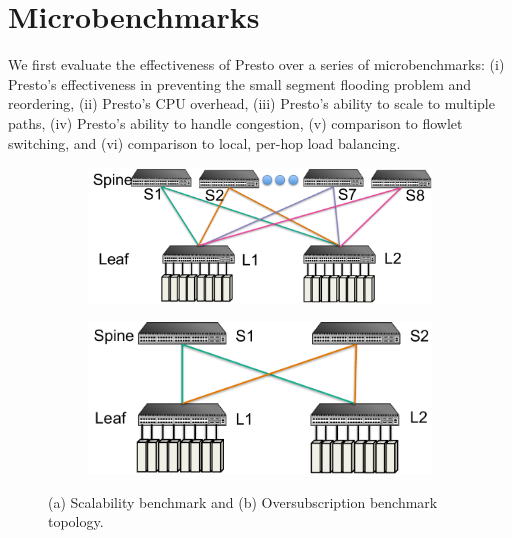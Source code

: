 \section{Microbenchmarks}
\label{sec:micro}

We first evaluate the effectiveness of Presto over a series of microbenchmarks: %
(i) Presto's effectiveness in preventing the small segment
flooding problem and reordering, (ii) Presto's CPU overhead, (iii) Presto's ability to scale
to multiple paths, (iv) Presto's ability to handle congestion, (v) comparison to flowlet
switching, and (vi) comparison to local, per-hop load balancing.

\begin{figure}[!t]
        \centering
	\begin{subfigure}[b]{0.45\textwidth}
        	\centering
  		\includegraphics[width=\textwidth]{presto/figures/micro_test_topology/micro_scalabilitytest_topology_refined.pdf}
        	\caption{}
		\label{micro_scalability_topology}
	\end{subfigure}
	\begin{subfigure}[b]{0.45\textwidth}
                \centering
		\includegraphics[width=\textwidth]{presto/figures/micro_test_topology/micro_congestiontest_topology_refined.pdf}
        	\caption{}
		\label{micro_congestion_topology}
	\end{subfigure}
	\caption{(a) Scalability benchmark and (b) Oversubscription benchmark topology.}
	\label{micro_topology}
\end{figure}

